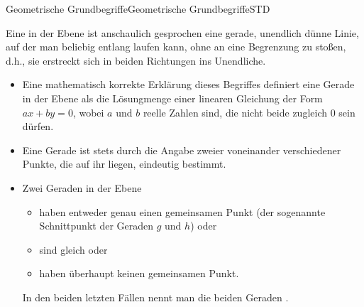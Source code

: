 \begin{MXContent}{Geometrische Grundbegriffe}{Geometrische Grundbegriffe}{STD}


\begin{MInfo}
Eine  in der Ebene ist anschaulich gesprochen eine gerade, unendlich d\"unne Linie, auf der man beliebig entlang laufen kann, ohne an eine Begrenzung zu sto\ss en, d.h., sie erstreckt sich in beiden Richtungen ins Unendliche.
\begin{itemize}
 \item Eine mathematisch korrekte Erkl\"arung dieses Begriffes definiert eine Gerade in der Ebene als die L\"osungmenge einer linearen Gleichung der Form $ax+by=0$, wobei $a$ und $b$ reelle Zahlen sind, die nicht beide zugleich $0$ sein d\"urfen.
 \item   Eine Gerade ist stets durch die Angabe zweier voneinander verschiedener Punkte, die auf ihr liegen, eindeutig bestimmt.
\item Zwei Geraden in der Ebene
\begin{itemize}
 \item haben entweder genau einen gemeinsamen Punkt (der sogenannte Schnittpunkt der Geraden $g$ und $h$) oder
\item sind gleich oder
 \item haben \"uberhaupt keinen gemeinsamen Punkt.
\end{itemize}
In den beiden letzten F\"allen nennt man die beiden Geraden .
\end{itemize}
\end{MInfo}



\end{MXContent}
